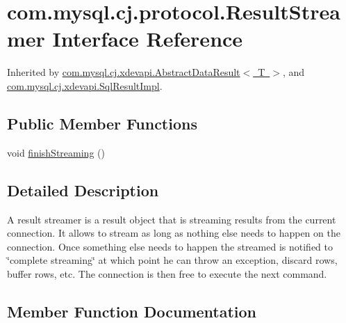 \hypertarget{interfacecom_1_1mysql_1_1cj_1_1protocol_1_1_result_streamer}{}\section{com.\+mysql.\+cj.\+protocol.\+Result\+Streamer Interface Reference}
\label{interfacecom_1_1mysql_1_1cj_1_1protocol_1_1_result_streamer}


Inherited by \mbox{\hyperlink{classcom_1_1mysql_1_1cj_1_1xdevapi_1_1_abstract_data_result}{com.\+mysql.\+cj.\+xdevapi.\+Abstract\+Data\+Result$<$ T $>$}}, and \mbox{\hyperlink{classcom_1_1mysql_1_1cj_1_1xdevapi_1_1_sql_result_impl}{com.\+mysql.\+cj.\+xdevapi.\+Sql\+Result\+Impl}}.

\subsection*{Public Member Functions}
\begin{DoxyCompactItemize}
\item 
void \mbox{\hyperlink{interfacecom_1_1mysql_1_1cj_1_1protocol_1_1_result_streamer_a58007e9c29f81c5e681f3df64fc4a055}{finish\+Streaming}} ()
\end{DoxyCompactItemize}


\subsection{Detailed Description}
A result streamer is a result object that is streaming results from the current connection. It allows to stream as long as nothing else needs to happen on the connection. Once something else needs to happen the streamed is notified to \char`\"{}complete streaming\char`\"{} at which point he can throw an exception, discard rows, buffer rows, etc. The connection is then free to execute the next command. 

\subsection{Member Function Documentation}
\mbox{\label{interfacecom_1_1mysql_1_1cj_1_1protocol_1_1_result_streamer_a58007e9c29f81c5e681f3df64fc4a055}} 
